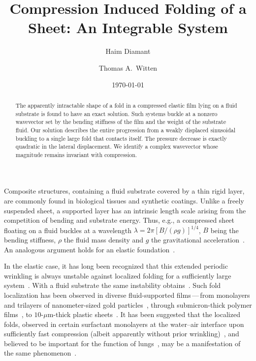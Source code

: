 \documentclass[prl,twocolumn,showpacs]{revtex4}
\begin{document}
\title{Compression Induced Folding of a Sheet: An Integrable System}

\author{Haim Diamant}

\author{Thomas A.\ Witten}

\date{\today}

\begin{abstract}
  The apparently intractable shape of a fold in a compressed elastic
  film lying on a fluid substrate is found to have an exact solution.
  Such systems buckle at a nonzero wavevector set by the bending
  stiffness of the film and the weight of the substrate fluid. Our
  solution describes the entire progression from a weakly displaced
  sinusoidal buckling to a single large fold that contacts itself.
  The pressure decrease is exactly quadratic in the lateral
  displacement. We identify a complex wavevector whose magnitude
  remains invariant with compression.
\end{abstract}

\maketitle

Composite structures, containing a fluid substrate covered by a thin
rigid layer, are commonly found in biological tissues and synthetic
coatings. Unlike a freely suspended sheet, a supported layer has an
intrinsic length scale arising from the competition of bending and
substrate energy. Thus, e.g., a compressed sheet floating on a fluid
buckles at a wavelength $\lambda=2\pi[B/(\rho g)]^{1/4}$, $B$ being
the bending stiffness, $\rho$ the fluid mass density and $g$ the
gravitational acceleration~\cite{Milner,CerdaMaha,VellaMaha,Huang2007,
ZhangWitten,BennyPRE,Huang2010,Vella2010}. An analogous argument holds
for an elastic foundation~\cite{Thompson}.

In the elastic case, it has long been recognized that this extended
periodic wrinkling is always unstable against localized folding for a
sufficiently large system~\cite{Hunt1993,LeeWaas1996,Audoly2008,
Reis2009,Brau2011}. With a fluid substrate the same instability
obtains~\cite{LukaCerda,Leahy2010,Holmes2010,DWpreprint,Audoly2011}.
Such fold localization has been observed in diverse fluid-supported
films\,---\,from monolayers and trilayers of nanometer-sized gold
particles~\cite{LukaCerda,Leahy2010}, through submicron-thick polymer
films~\cite{Holmes2010}, to $10$-$\mu$m-thick plastic
sheets~\cite{LukaCerda}. It has been suggested that the localized folds,
observed in certain surfactant monolayers at the water--air interface
upon sufficiently fast compression (albeit apparently without prior
wrinkling)~\cite{Lee1998,Gopal2001,Ybert2002,Fischer2005,jpc06,
Longo2009}, and believed to be important for the function of
lungs~\cite{Lee2008}, may be a manifestation of the same
phenomenon~\cite{LukaCerda,DWpreprint}.
\end{document}
